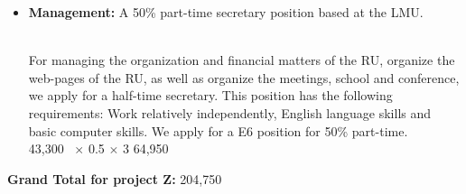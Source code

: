 \documentclass[10pt,fleqn,twoside]{article}
\begin{document}
\begin{itemize}
For regular expenses of the management (printing costs, postal services, toner,
copying materials, etc..) we request 1000~\EUR{} per year.
\vspace{0.2em}\\
1000~\EUR{} $\times$ 3              \hfill 3,000~\EUR{}\\
\item 
\begin{Emphasize}
{\bf Management:} A 50\% part-time secretary position based at the LMU.
\end{Emphasize}\\
For managing the organization and financial matters of the RU, 
organize the web-pages of the RU, as
well as organize the meetings, school and conference, we apply for
a half-time secretary. This position has the following requirements:
Work relatively independently, English language skills and 
basic computer skills. We apply for a E6 position for 50\% part-time.
\vspace{0.2em}\\
43,300~\EUR{} $\times$ 0.5 $\times$ 3              \hfill 64,950~\EUR{}\\
\end{itemize}

\begin{Emphasize}
{\bf Grand Total for project Z:}  \hfill 204,750~\EUR{} \\
\end{Emphasize}\\
 
%
\end{document}
